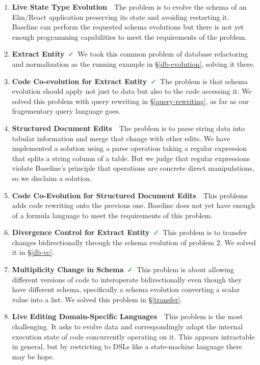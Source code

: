 \documentclass[english,submission]{programming}
\theoremstyle{definition}
\newcommand{\redCross}{\textcolor{red}{\ \faTimes\ }}
\newcommand{\greenCheck}{\textcolor{ForestGreen}{\ \faCheck\ }}
\begin{document}
\begin{enumerate}

  \item \textbf{Live State Type Evolution}\redCross The problem is to evolve the schema of an Elm/React application preserving its state and avoiding restarting it. Baseline can perform the requested schema evolutions but there is not yet enough programming capabilities to meet the requirements of the problem.

  \item \textbf{Extract Entity}\greenCheck We took this common problem of database refactoring and normalization as the running example in \S\ref{db-evolution}, solving it there.

  \item \textbf{Code Co-evolution for Extract Entity}\greenCheck The problem is that schema evolution should apply not just to data but also to the code accessing it. We solved this problem with query rewriting in \S\ref{query-rewriting}, as far as our fragementary query language goes.

  \item \textbf{Structured Document Edits}\redCross The problem is to parse string data into tabular information and merge that change with other edits. We have implemented a solution using a \textsf{parse} operation taking a regular expression that splits a string column of a table. But we judge that regular expressions violate Baseline's principle that operations are concrete direct manipulations, so we disclaim a solution.

  \item \textbf{Code Co-Evolution for Structured Document Edits}\redCross This problems adds code rewriting onto the previous one. Baseline does not yet have enough of a formula language to meet the requirements of this problem.

  \item \textbf{Divergence Control for Extract Entity}\greenCheck This problem is to transfer changes bidirectionally through the schema evolution of problem 2. We solved it in \S\ref{db-vc}.

  \item \textbf{Multiplicity Change in Schema}\greenCheck This problem is about allowing different versions of code to interoperate bidirectionally even though they have different schema, specifically a schema evolution converting a scalar value into a list. We solved this problem in \S\ref{transfer}.

  \item \textbf{Live Editing Domain-Specific Languages}\redCross This problem is the most challenging. It asks to evolve data and correspondingly adapt the internal execution state of code concurrently operating on it. This appears intractable in general, but by restricting to DSLs like a state-machine language there may be hope.

\end{enumerate}
\end{document}
